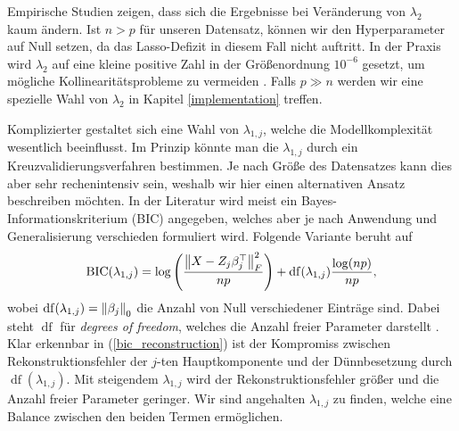 Empirische Studien zeigen, dass sich die Ergebnisse bei Veränderung von $\lambda_2$ kaum ändern. Ist $n > p$ für unseren Datensatz, können wir den Hyperparameter auf Null setzen, da das Lasso-Defizit in diesem Fall nicht auftritt. In der Praxis wird $\lambda_2$ auf eine kleine positive Zahl in der Größenordnung $10^{-6}$ gesetzt, um mögliche Kollinearitätsprobleme zu vermeiden \cite{zou_sparsepca}. Falls $p \gg n$ werden wir eine spezielle Wahl von $\lambda_2$ in Kapitel \ref{implementation} treffen.

Komplizierter gestaltet sich eine Wahl von $\lambda_{1,j}$, welche die Modellkomplexität wesentlich beeinflusst. Im Prinzip könnte man die $\lambda_{1,j}$ durch ein Kreuzvalidierungsverfahren bestimmen. Je nach Größe des Datensatzes kann dies aber sehr rechenintensiv sein, weshalb wir hier einen alternativen Ansatz beschreiben möchten. In der Literatur wird meist ein Bayes-Informationskriterium (BIC) angegeben, welches aber je nach Anwendung und Generalisierung verschieden formuliert wird. Folgende Variante beruht auf \cite{hubert, allen}
\begin{align}
\label{bic_reconstruction}
\operatorname{BIC}(\lambda_{1,j}) = \log\left(\frac{\left\lVert X - Z_j\beta_j^{\top} \right\rVert_{F}^{2}}{np}\right) + \operatorname{df}(\lambda_{1,j}) \frac{\log(np)}{np},
\end{align}
wobei $\operatorname{df}(\lambda_{1,j}) = \left\lVert \beta_j \right\rVert_0$ die Anzahl von Null verschiedener Einträge sind. Dabei steht $\operatorname{df}$ für \textit{degrees of freedom}, welches die Anzahl freier Parameter darstellt \cite{hastie_elements}. Klar erkennbar in (\ref{bic_reconstruction}) ist der Kompromiss zwischen Rekonstruktionsfehler der $j$-ten Hauptkomponente und der Dünnbesetzung durch $\operatorname{df}(\lambda_{1,j})$. Mit steigendem $\lambda_{1,j}$ wird der Rekonstruktionsfehler größer und die Anzahl freier Parameter geringer. Wir sind angehalten $\lambda_{1,j}$ zu finden, welche eine Balance zwischen den beiden Termen ermöglichen.

